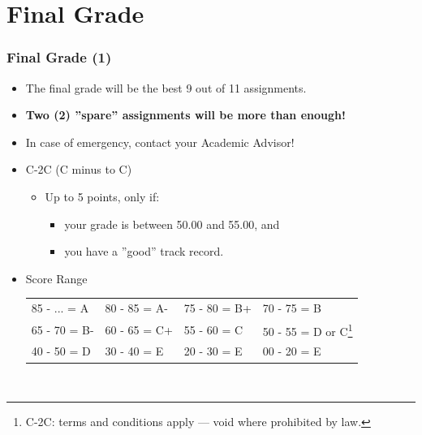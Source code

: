 \documentclass[aspectratio=169, xcolor=table, notheorems, hyperref={pdfpagelabels=false}]{beamer}
\begin{document}
\section{Final Grade}
\begin{frame}
\frametitle{Final Grade (1)}

\begin{itemize}
\item The final grade will be the best 9 out of 11 assignments.
\item \textbf{Two (2) ''spare'' assignments will be more than enough!}
\item In case of emergency, contact your Academic Advisor!
\item C-2C (C minus to C)
\begin{itemize}
\item Up to 5 points, only if:
\begin{itemize}
\item your grade is between 50.00 and 55.00, and
\item you have a ''good'' track record.
\end{itemize}
\end{itemize}

\item Score Range\\[10pt]
\begin{tabular}{l l l l}
\hline
85 - ... = A & 80 - 85 = A- & 75 - 80 = B+ & 70 - 75 = B \\
65 - 70 = B-      & 60 - 65 = C+ & 55 - 60 = C  & 
50 - 55 = D or C\footnote{C-2C: terms and conditions apply --- void where prohibited by law.}  \\
40 - 50 = D  & 30 - 40 = E  & 20 - 30 = \small E & 00 - 20 = \tiny E   \\
\hline \end{tabular}\\[10pt]
\end{itemize}
\end{frame}
\end{document}
